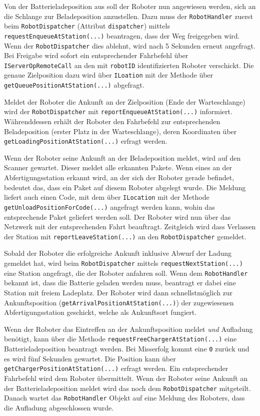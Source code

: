 Von der Batterieladeposition aus soll der Roboter nun angewiesen werden, sich an die Schlange zur Beladeposition anzustellen. Dazu muss der \texttt{RobotHandler} zuerst beim \texttt{RobotDispatcher} (Attribut \texttt{dispatcher}) mittels \texttt{requestEnqueueAtStation(...)} beantragen, dass der Weg freigegeben wird.
Wenn der \texttt{RobotDispatcher} dies ablehnt, wird nach 5 Sekunden erneut angefragt.
Bei Freigabe wird sofort ein entsprechender Fahrbefehl über \texttt{IServerOpRemoteCall} an den mit \texttt{robotID} identifizierten Roboter verschickt.
Die genaue Zielposition dazu wird über \texttt{ILoation} mit der Methode über \texttt{getQueuePositionAtStation(...)} abgefragt.

Meldet der Roboter die Ankunft an der Zielposition (Ende der Warteschlange) wird der \texttt{RobotDispatcher} mit \texttt{reportEnqueueAtStation(...)} informiert.
Währenddessen erhält der Roboter den Fahrbefehl zur entsprechenden Beladeposition (erster Platz in der Warteschlange), deren Koordinaten über \texttt{getLoadingPositionAtStation(...)} erfragt werden.

Wenn der Roboter seine Ankunft an der Beladeposition meldet, wird auf den Scanner gewartet.
Dieser meldet alle erkannten Pakete. Wenn eines an der Abfertigungsstation erkannt wird, an der sich der Roboter gerade befindet, bedeutet das, dass ein Paket auf diesem Roboter abgelegt wurde.
Die Meldung liefert auch einen Code, mit dem über \texttt{ILocation} mit der Methode \texttt{getUnloadPositionForCode(...)} angefragt werden kann, wohin das entsprechende Paket geliefert werden soll. 
Der Roboter wird nun über das Netzwerk mit der entsprechenden Fahrt beauftragt. Zeitgleich wird dass Verlassen der Station mit \texttt{reportLeaveStation(...)} an den \texttt{RobotDispatcher} gemeldet.

Sobald der Roboter die erfolgreiche Ankunft inklusive Abwurf der Ladung gemeldet hat, wird beim \texttt{RobotDispatcher} mittels \texttt{requestNextStation(...)} eine Station angefragt, die der Roboter anfahren soll.
Wenn dem \texttt{RobotHandler} bekannt ist, dass die Batterie geladen werden muss, beantragt er dabei eine Station mit freiem Ladeplatz.
Der Roboter wird dann schnellstmöglich zur Ankunftsposition (\texttt{getArrivalPositionAtStation(...)}) der zugewiesenen Abfertigungsstation geschickt, welche als Ankunftsort fungiert.

Wenn der Roboter das Eintreffen an der Ankunftsposition meldet \emph{und} Aufladung benötigt, kann über die Methode \texttt{requestFreeChargerAtStation(...)} eine Batterieladeposition beantragt werden. Bei Misserfolg kommt eine \texttt{0} zurück und es wird fünf Sekunden gewartet. Die Position kann über \texttt{getChargerPositionAtStation(...)} erfragt werden.
Ein entsprechender Fahrbefehl wird dem Roboter übermittelt. Wenn der Roboter seine Ankunft an der Batterieladeposition meldet wird das noch dem \texttt{RobotDispatcher} mitgeteilt. 
Danach wartet das \texttt{RobotHandler} Objekt auf eine Meldung des Roboters, dass die Aufladung abgeschlossen wurde.

